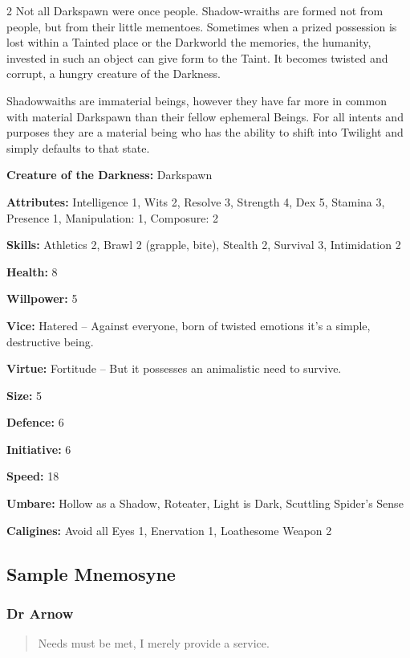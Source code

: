 \begin{multicols}{2}
Not all Darkspawn were once people. Shadow-wraiths are formed not from people, but from their little mementoes. Sometimes when a prized possession is lost within a Tainted place or the Darkworld the memories, the humanity, invested in such an object can give form to the Taint. It becomes twisted and corrupt, a hungry creature of the Darkness.

Shadowwaiths are immaterial beings, however they have far more in common with material Darkspawn than their fellow ephemeral Beings. For all intents and purposes they are a material being who has the ability to shift into Twilight and simply defaults to that state. 

\noindent \textbf{Creature of the Darkness:} Darkspawn

\noindent \textbf{Attributes:} Intelligence 1, Wits 2, Resolve 3, Strength 4, Dex 5, Stamina 3, Presence 1, Manipulation: 1, Composure: 2

\noindent \textbf{Skills:} Athletics 2, Brawl 2 (grapple, bite), Stealth 2, Survival 3, Intimidation 2

\noindent \textbf{Health:} 8

\noindent \textbf{Willpower:} 5

\noindent \textbf{Vice:} Hatered – Against everyone, born of twisted emotions it's a simple, destructive being.

\noindent \textbf{Virtue:} Fortitude – But it possesses an animalistic need to survive.

\noindent \textbf{Size:} 5

\noindent \textbf{Defence:} 6

\noindent \textbf{Initiative:} 6

\noindent \textbf{Speed:} 18

\noindent \textbf{Umbare:} Hollow as a Shadow, Roteater, Light is Dark, Scuttling Spider's Sense

\noindent \textbf{Caligines:} Avoid all Eyes 1, Enervation 1, Loathesome Weapon 2

\subsection*{Sample Mnemosyne}
\label{subsec:SampleMnemosyne}

\subsubsection*{Dr Arnow}

\begin{quote}Needs must be met, I merely provide a service.\end{quote}


\end{multicols}

